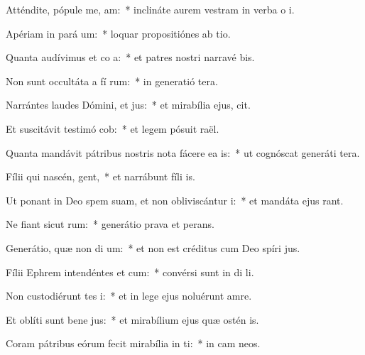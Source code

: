 \item Atténdite, pópule me,  am:~* inclináte aurem vestram in verba o i.
\item Apériam in pará  um:~* loquar propositiónes ab tio.
\item Quanta audívimus et co a:~* et patres nostri narravé bis.
\item Non sunt occultáta a fí rum:~* in generatió tera.
\item Narrántes laudes Dómini, et  jus:~* et mirabília ejus,  cit.
\item Et suscitávit testimó  cob:~* et legem pósuit  raël.
\item Quanta mandávit pátribus nostris nota fácere ea  is:~* ut cognóscat generáti tera.
\item Fílii qui nascén,  gent,~* et narrábunt fíli is.
\item Ut ponant in Deo spem suam, et non obliviscántur  i:~* et mandáta ejus rant.
\item Ne fiant sicut  rum:~* generátio prava et perans.
\item Generátio, quæ non di  um:~* et non est créditus cum Deo spíri jus.
\item Fílii Ephrem intendéntes et  cum:~* convérsi sunt in di li.
\item Non custodiérunt tes i:~* et in lege ejus noluérunt amre.
\item Et oblíti sunt bene jus:~* et mirabílium ejus quæ ostén is.
\item Coram pátribus eórum fecit mirabília in  ti:~* in cam neos.
